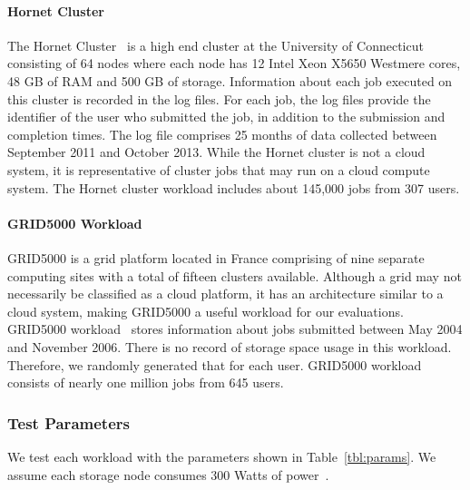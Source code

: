 \documentclass[preprint,12pt]{elsarticle}
\begin{document}
\paragraph{Hornet Cluster}
The Hornet Cluster~\cite{hornet} is a high end cluster at the University
of Connecticut consisting of 64 nodes where each node has 12 Intel Xeon X5650
Westmere cores, 48 GB of RAM and 500 GB of storage. Information about each
job executed on this cluster is recorded in the log files. For each job, the log files
provide the identifier of the user who submitted the job, in addition to the
submission and completion times. The log file comprises 25 months of data
collected between September 2011 and October 2013. While the Hornet cluster
is not a cloud system, it is representative of cluster jobs that may run on
a cloud compute system. The Hornet cluster workload includes about 145,000
jobs from 307 users.

\paragraph{GRID5000 Workload}
GRID5000 is a grid platform located in France comprising of nine separate computing
sites with a total of fifteen clusters available. Although a grid may not necessarily
be classified as a cloud platform, it has an architecture similar to a cloud system,
making GRID5000 a useful workload for our evaluations. GRID5000 workload~\cite{grid5000}
stores information about jobs submitted between May 2004 and November 2006. There is
no record of storage space usage in this workload.  Therefore, we randomly generated
that for each user. GRID5000 workload consists of nearly one million jobs from 645
users. 

\subsubsection{Test Parameters}
We test each workload with the parameters shown in Table~\ref{tbl:params}. We assume each storage
node consumes 300 Watts of power~\cite{DBLP:journals/computer/BianchiniR04}.
\end{document}
